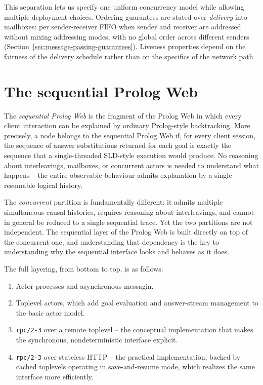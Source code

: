 \noindent This separation lets us specify one uniform concurrency
model while allowing multiple deployment choices. Ordering guarantees
are stated over \emph{delivery} into mailboxes: per sender-receiver
FIFO when sender and receiver are addressed without mixing addressing
modes, with no global order across different senders
(Section~\ref{sec:message-passing-guarantees}). Liveness properties
depend on the fairness of the delivery schedule rather than on the
specifics of the network path.



\section{The sequential Prolog Web}\label{sec:sequential-prolog-web}

The \textit{sequential Prolog Web} is the fragment of the Prolog Web
in which every client interaction can be explained by ordinary
Prolog-style backtracking. More precisely, a node belongs to the
sequential Prolog Web if, for every client session, the sequence of
answer substitutions returned for each goal is exactly the sequence
that a single-threaded SLD-style execution would produce. No
reasoning about interleavings, mailboxes, or concurrent actors is
needed to understand what happens -- the entire observable behaviour
admits explanation by a single resumable logical history.

The \textit{concurrent} partition is fundamentally different: it
admits multiple simultaneous causal histories, requires reasoning
about interleavings, and cannot in general be reduced to a single
sequential trace. Yet the two partitions are not independent. The
sequential layer of the Prolog Web is built directly on top of the concurrent one, and
understanding that dependency is the key to understanding why the
sequential interface looks and behaves as it does.

The full layering, from bottom to top, is as follows:

\begin{enumerate}
    \item Actor processes and asynchronous messagin.
    \item Toplevel actors, which add goal evaluation and answer-stream management to the basic actor model.
    \item \texttt{rpc/2-3} over a remote toplevel -- the conceptual implementation that makes the synchronous, nondeterministic interface explicit.
    \item \texttt{rpc/2-3} over stateless HTTP -- the practical implementation, backed by cached toplevels operating in save-and-resume mode, which realizes the same interface more efficiently.
\end{enumerate}

